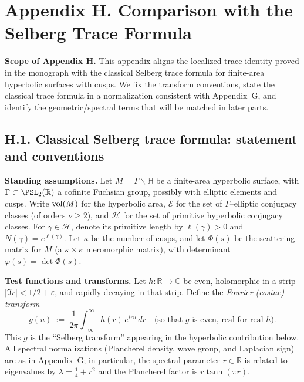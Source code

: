 \appendix
\section*{Appendix H. Comparison with the Selberg Trace Formula}
\label{appH:root}

\noindent\textbf{Scope of Appendix H.}
This appendix aligns the localized trace identity proved in the monograph with the classical
Selberg trace formula for finite-area hyperbolic surfaces with cusps. We fix the transform
conventions, state the classical trace formula in a normalization consistent with
Appendix~G, and identify the geometric/spectral terms that will be matched in later parts.

\subsection*{H.1. Classical Selberg trace formula: statement and conventions}
\label{appH:selberg-statement}

\noindent\textbf{Standing assumptions.}
Let $M=\Gamma\backslash\mathbb H$ be a finite-area hyperbolic surface, with $\Gamma\subset\PSL_2(\mathbb R)$ a cofinite Fuchsian group, possibly with elliptic elements and cusps.
Write $\operatorname{vol}(M)$ for the hyperbolic area, $\mathcal E$ for the set of $\Gamma$–elliptic
conjugacy classes (of orders $\nu\ge 2$), and $\mathcal H$ for the set of primitive hyperbolic
conjugacy classes. For $\gamma\in\mathcal H$, denote its primitive length by
$\ell(\gamma)>0$ and $N(\gamma)=e^{\ell(\gamma)}$.
Let $\kappa$ be the number of cusps, and let $\Phi(s)$ be the scattering matrix
for $M$ (a $\kappa\times\kappa$ meromorphic matrix), with determinant $\varphi(s)=\det\Phi(s)$.

\medskip
\noindent\textbf{Test functions and transforms.}
Let $h:\mathbb R\to\mathbb C$ be even, holomorphic in a strip $|\Im r|<1/2+\varepsilon$,
and rapidly decaying in that strip. Define the \emph{Fourier (cosine) transform}
\begin{equation}\label{eq:H:Fourier-pair}
g(u)\ :=\ \frac{1}{2\pi}\int_{-\infty}^{\infty} h(r)\,e^{i r u}\,dr
\quad\text{(so that $g$ is even, real for real $h$).}
\end{equation}
This $g$ is the “Selberg transform” appearing in the hyperbolic contribution below.
All spectral normalizations (Plancherel density, wave group, and Laplacian sign)
are as in Appendix~G; in particular, the spectral parameter $r\in\mathbb R$ is related to
eigenvalues by $\lambda=\tfrac14 + r^2$ and the Plancherel factor is $r\tanh(\pi r)$.

